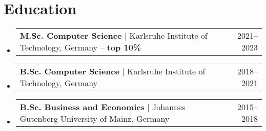 \documentclass[letterpaper,11pt]{article}
\makeatletter
\newcommand{\resumeProjectHeading}[2]{
    \item
    \begin{tabular*}{0.97\textwidth}{l@{\extracolsep{\fill}}r}
      \small#1 & #2 \\
    \end{tabular*}\vspace{-7pt}
}
\newcommand{\resumeSubHeadingListStart}{\begin{itemize}[leftmargin=0.15in, label={}]}
\newcommand{\resumeSubHeadingListEnd}{\end{itemize}}
\makeatother
\begin{document}







\section{Education}
\vspace{5pt}
\resumeSubHeadingListStart

\resumeProjectHeading
{\textbf{M.Sc. Computer Science} \space $|$ \space Karlsruhe Institute of Technology, Germany --  \textbf{top 10\%}}{2021--2023}

\resumeProjectHeading
{\textbf{B.Sc. Computer Science} \space $|$ \space Karlsruhe Institute of Technology, Germany \hspace{5pt}}{2018--2021}

\resumeProjectHeading
{\textbf{B.Sc. Business and Economics} \space $|$ \space Johannes Gutenberg University of Mainz, Germany\hspace{43.5pt} \space}{2015--2018}

\vspace*{5pt}
\resumeSubHeadingListEnd
\end{document}
